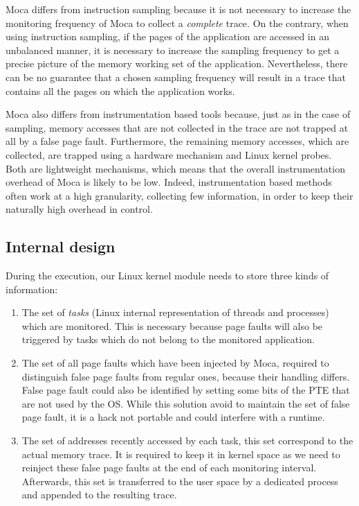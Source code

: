 \gls{Moca} differs from instruction sampling because it is not necessary to increase the monitoring frequency of \gls{Moca} to collect a \emph{complete} trace.
On the contrary, when using instruction sampling, if the pages of the application are accessed in an unbalanced manner, it is necessary to increase the sampling frequency to get a precise picture of the memory working set of the application.
Nevertheless, there can be no guarantee that a chosen sampling frequency will result in a trace that contains all the pages on which the application works.

\gls{Moca} also differs from instrumentation based tools because, just as in the case of sampling, memory accesses that are not collected in the trace are not trapped at all by a false page fault.
Furthermore, the remaining memory accesses, which are collected, are trapped using a hardware mechanism and Linux kernel probes.
Both are lightweight mechanisms, which means that the overall instrumentation overhead of \gls{Moca} is likely to be low.
Indeed, instrumentation based methods often work at a high granularity, collecting few information, in order to keep their naturally high overhead in control.

\subsection{Internal design}

During the execution, our \gls{Linux} kernel module needs to store three kinds of information:

\begin{enumerate}
    \item The set of \emph{tasks} (Linux internal representation of threads and processes) which are
monitored.
    This is necessary because page faults will also be triggered by tasks which do not belong to the monitored application.
    \item The set of all page faults which have been injected by \gls{Moca}, required to distinguish false page faults from regular ones, because their handling differs.
        False page fault could also be identified by setting some bits of the \gls{PTE} that are not used by the \gls{OS}.
        While this solution avoid to maintain the set of false page fault, it is a hack not portable and could interfere with a runtime.
    \item The set of addresses recently accessed by each task, this set correspond to the actual memory trace.
        It is required to keep it in kernel space as we need to reinject these false page faults at the end of each monitoring interval.
        Afterwards, this set is transferred to the user space by a dedicated process and appended to the resulting trace.
\end{enumerate}

